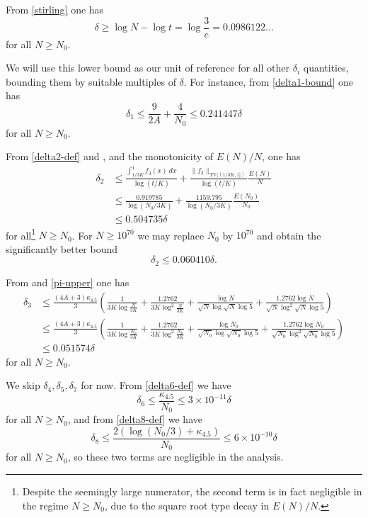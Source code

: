 \documentclass[12pt,a4paper,reqno]{amsart}
\numberwithin{equation}{section}
\theoremstyle{plain}
\theoremstyle{definition}
\begin{document}
From \eqref{stirling} one has
$$ \delta \geq \log N - \log t = \log \frac{3}{e} = 0.0986122\dots$$
for all $N \geq N_0$.  

We will use this lower bound as our unit of reference for all other $\delta_i$ quantities, bounding them by suitable multiples of $\delta$.  For instance, from \eqref{delta1-bound} one has
$$ \delta_1 \leq \frac{9}{2A} + \frac{4}{N_0} \leq 0.241447 \delta$$
for all $N \geq N_0$.

From \eqref{delta2-def} and , and the monotonicity of $E(N)/N$, one has
\begin{align*}
  \delta_2 &\leq \frac{\int_{1/3K}^1 f_3(x)\ dx}{\log(t/K)}  + \frac{\|f_3\|_{\mathrm{TV}((1/3K,1])}}{\log(t/K)}  \frac{E(N)}{N} \\
  &\leq \frac{0.919785}{\log(N_0/3K)}  + \frac{1159.795}{\log(N_0/3K)}  \frac{E(N_0)}{N_0} \\
  &\leq 0.504735 \delta
\end{align*}
for all\footnote{Despite the seemingly large numerator, the second term is in fact negligible in the regime $N \geq N_0$, due to the square root type decay in $E(N)/N$.} $N \geq N_0$.  For $N \geq 10^{70}$ we may replace $N_0$ by $10^{70}$ and obtain the significantly better bound
$$ \delta_2 \leq 0.060410 \delta.$$

From  and \eqref{pi-upper} one has
\begin{align*}
\delta_3 &\leq \frac{(4A+3)\kappa_{4.5}}{3} \left(\!
\frac{1}{3K \log \frac{N}{3K}} + \frac{1.2762}{3K \log^2\! \frac{N}{3K}}
+ \frac{\log N}{\sqrt{N} \log\! \sqrt{N}\log 5 } + \frac{1.2762 \log N}{\sqrt{N} \log^2\!\! \sqrt{N}\log 5 } \!\right) \\
&\leq \frac{(4A+3)\kappa_{4.5}}{3} \left(\!
  \frac{1}{3K \log\frac{N_0}{3K}} + \frac{1.2762}{3K \log^2\!\frac{N_0}{3K}}
  + \frac{\log N_0}{\sqrt{N_0} \log\! \sqrt{N_0}\log 5 } + \frac{1.2762 \log N_0}{\sqrt{N_0} \log^2\!\! \sqrt{N_0}\log 5 }\! \right) \\
&\leq 0.051574 \delta
\end{align*}
for all $N \geq N_0$.

We skip $\delta_4, \delta_5, \delta_7$ for now.  From \eqref{delta6-def} we have
$$ \delta_6 \leq \frac{\kappa_{4.5}}{N_0} \leq 3 \times 10^{-11} \delta$$
for all $N \geq N_0$, and from \eqref{delta8-def} we have
$$ \delta_8 \leq \frac{2(\log(N_0/3) + \kappa_{4.5})}{N_0} \leq 6 \times 10^{-10} \delta$$
for all $N \geq N_0$, so these two terms are negligible in the analysis.
\end{document}
